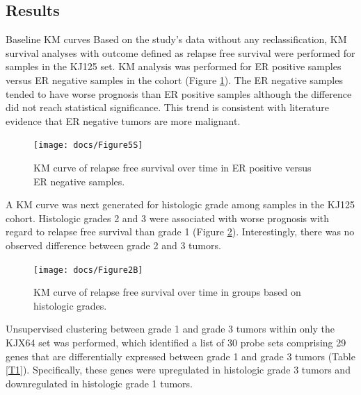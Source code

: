 \documentclass[a4paper,10pt]{article}
\begin{document}
\subsection{Results}
Baseline KM curves
Based on the study’s data without any reclassification, KM survival analyses with outcome 
defined as relapse free survival were performed for samples in the KJ125 set.   KM analysis 
was performed for ER positive samples versus ER negative samples in the cohort (Figure \ref{1B}). 
The ER negative samples tended to have worse prognosis than ER positive samples although 
the difference did not reach statistical significance. This trend is consistent with literature 
evidence that ER negative tumors are more malignant.  

 \begin{figure}
\centering
\texttt{[image: docs/Figure5S]}
\caption{ KM curve of relapse free survival over time in ER positive versus ER negative samples.}\label{1B}
\end{figure}
A KM curve was next generated for histologic grade among samples in the KJ125 cohort.  
Histologic grades 2 and 3 were associated with worse prognosis with regard to relapse 
free survival than grade 1 (Figure \ref{2B}).  Interestingly, there was no observed difference 
between grade 2 and 3 tumors.  

 \begin{figure}
\centering
\texttt{[image: docs/Figure2B]}
\caption{ KM curve of relapse free survival over time in groups based on histologic grades.}\label{2B}
\end{figure}

Unsupervised clustering between grade 1 and grade 3 tumors within only the 
KJX64 set was performed, which identified a list of 30 probe sets comprising 
29 genes that are differentially expressed between grade 1 and grade 3 tumors 
(Table \ref{T1}).  Specifically, these genes were upregulated in histologic grade 3 tumors 
and downregulated in histologic grade 1 tumors.  
\end{document}

